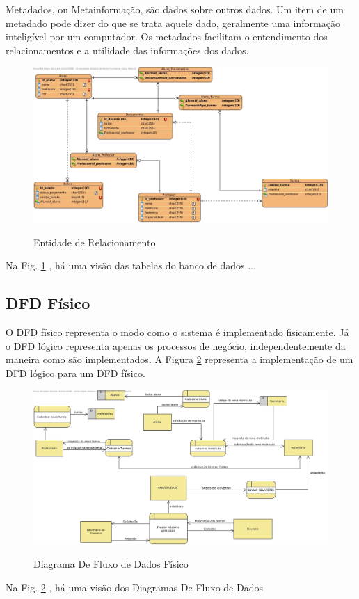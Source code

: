 Metadados, ou Metainformação, são dados sobre outros dados. Um item de um metadado pode dizer do que se trata aquele dado, geralmente uma informação inteligível por um computador. 
Os metadados facilitam o entendimento dos relacionamentos e a utilidade das informações dos dados.

 
 
               \begin{figure}[H]
                 \caption{Entidade de Relacionamento}
               \centering %
                \includegraphics[width=13cm]{analisedeProjeto/SAcademicoERD} %
                \label{figura:EntidadedeRelacionamento}
                \end{figure}
                Na Fig. \ref{figura:EntidadedeRelacionamento} , há uma visão das tabelas do banco de dados ...

\subsection{DFD Físico}
O DFD físico representa o modo como o sistema é implementado fisicamente. Já o DFD lógico representa apenas os processos de negócio, independentemente da maneira como são implementados. A Figura \ref{figura:DFDFisico} representa a implementação de um DFD lógico para um DFD físico.



               \begin{figure}[H]
                 \caption{Diagrama De Fluxo de Dados Físico}
               \centering %
                \includegraphics[width=13cm]{analisedeProjeto/DFDFisico} %
                \label{figura:DFDFisico}
                \end{figure}
                Na Fig. \ref{figura:DFDFisico} , há uma visão dos Diagramas De Fluxo de Dados
                
